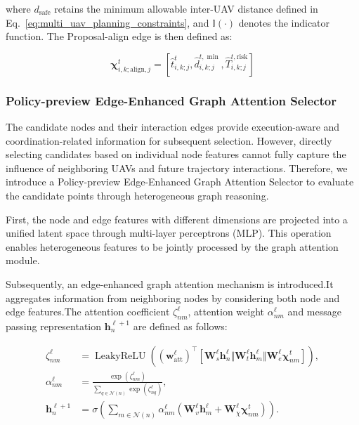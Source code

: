 \noindent
where $d_{\mathrm{safe}}$ retains the minimum allowable inter-UAV distance defined in Eq.~\eqref{eq:multi_uav_planning_constraints}, and $\mathbb{I}(\cdot)$ denotes the indicator function. The Proposal-align edge is then defined as:

\begin{equation}
    \label{eq:proposal_align_edge}
    \boldsymbol\chi_{i,k;\mathrm{align},j}^{t}
    =
    [
        \hat t_{i,k;j}^{t},
        \hat d_{i,k;j}^{t,\min},
        \hat T_{i,k;j}^{t,
        \mathrm{risk}}
        ]
\end{equation}

\subsubsection{Policy-preview Edge-Enhanced Graph Attention Selector}

The candidate nodes and their interaction edges provide execution-aware and coordination-related information for subsequent selection. However, directly selecting candidates based on individual node features cannot fully capture the influence of neighboring UAVs and future trajectory interactions. Therefore, we introduce a Policy-preview Edge-Enhanced Graph Attention Selector to evaluate the candidate points through heterogeneous graph reasoning. 

First, the node and edge features with different dimensions are projected into a unified latent space through multi-layer perceptrons (MLP). This operation enables heterogeneous features to be jointly processed by the graph attention module. 

Subsequently, an edge-enhanced graph attention mechanism is introduced.It aggregates information from neighboring nodes by considering both node and edge features.The attention coefficient $\zeta_{nm}^{\ell}$, attention weight $\alpha_{nm}^{\ell}
$ and message passing representation $\mathbf h_n^{\ell+1}$ are defined as follows:

\begin{equation}
\label{eq:edge_enhanced_gat}
\begin{aligned}
\zeta_{nm}^{\ell}
&=
\operatorname{LeakyReLU}
\left(
(\mathbf w_{\mathrm{att}}^{\ell})^\top
[
\mathbf W_s^{\ell}\mathbf h_n^{\ell}
\Vert
\mathbf W_t^{\ell}\mathbf h_m^{\ell}
\Vert
\mathbf W_e^{\ell}\boldsymbol\chi_{nm}^{t}
]
\right),
\\
\alpha_{nm}^{\ell}
&=
\frac{
\exp(\zeta_{nm}^{\ell})
}
{
\sum_{q\in\mathcal N(n)}
\exp(\zeta_{nq}^{\ell})
},
\\
\mathbf h_n^{\ell+1}
&=
\sigma
\left(
\sum_{m\in\mathcal N(n)}
\alpha_{nm}^{\ell}
(
\mathbf W_v^{\ell}\mathbf h_m^{\ell}
+
\mathbf W_{\chi}^{\ell}\boldsymbol\chi_{nm}^{t}
)
\right).
\end{aligned}
\end{equation}

